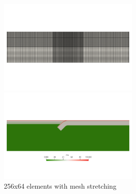 \begin{center}
\includegraphics[width=7cm]{python_codes/fieldstone_67/images/grid}
\includegraphics[width=7cm]{python_codes/fieldstone_67/images/rho}\\
{\captionfont 256x64 elements with mesh stretching}
\end{center}



